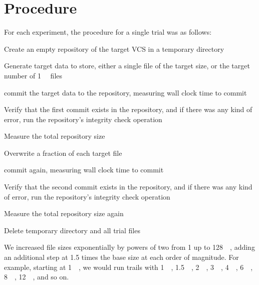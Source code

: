 \section{Procedure}

For each experiment, the procedure for a single trial was as follows:

\begin{tight_enumerate}

    \item Create an empty repository of the target \gls{VCS} in a temporary
        directory

    \item Generate target data to store, either a single file of the target
        size, or the target number of \SI{1}{\kibi\byte} files

    \item \Gls{commit} the target data to the repository, measuring wall clock
        time to \gls{commit}

    \item Verify that the first \gls{commit} exists in the repository, and if
        there was any kind of error, run the repository's integrity check
        operation

    \item Measure the total repository size

    \item Overwrite a fraction of each target file

    \item \Gls{commit} again, measuring wall clock time to \gls{commit}

    \item Verify that the second \gls{commit} exists in the repository, and if
        there was any kind of error, run the repository's integrity check
        operation

    \item Measure the total repository size again

    \item Delete temporary directory and all trial files

\end{tight_enumerate}

We increased file sizes exponentially by powers of two from \SI{1}{\byte} up to
\SI{128}{\gibi\byte}, adding an additional step at \num{1.5} times the base size
at each order of magnitude. For example, starting at \SI{1}{\mebi\byte}, we
would run trails with \SI{1}{\mebi\byte}, \SI{1.5}{\mebi\byte},
\SI{2}{\mebi\byte}, \SI{3}{\mebi\byte}, \SI{4}{\mebi\byte}, \SI{6}{\mebi\byte},
\SI{8}{\mebi\byte}, \SI{12}{\mebi\byte}, and so on.

